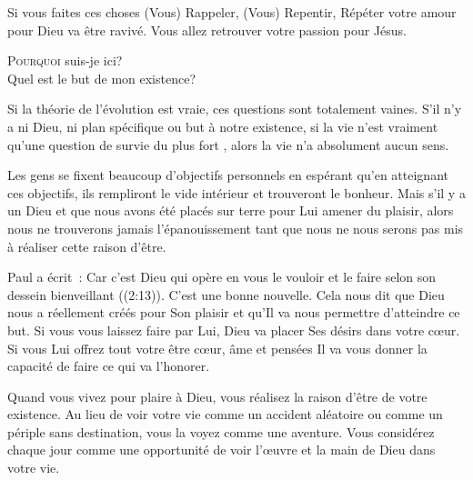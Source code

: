 Si vous faites ces choses
 \ocadr (Vous) Rappeler, (Vous) Repentir, Répéter \fcadr{}
 votre amour pour Dieu va être ravivé.
 Vous allez retrouver votre passion pour Jésus. 

\dvrule






\lettrine{P}{ourquoi} suis-je ici?\\
 Quel est le but de mon existence?

Si la théorie de l'évolution est vraie, ces questions sont totalement vaines.
 S'il n'y a ni Dieu, ni plan spécifique ou but à notre existence,
 si la vie n'est vraiment qu'une question de \og survie du plus fort \fg{},
 alors la vie n'a absolument aucun sens. 

Les gens se fixent beaucoup d'objectifs personnels en espérant
 qu'en atteignant ces objectifs, ils rempliront le vide intérieur
 et trouveront le bonheur. Mais s'il y a un Dieu et que nous avons
 été placés sur terre pour Lui amener du plaisir,
 alors nous ne trouverons jamais l'épanouissement
 tant que nous ne nous serons pas mis à réaliser cette raison d'être. 


Paul a écrit~: 
 \og Car c'est Dieu qui opère en vous le vouloir et le faire
 selon son dessein bienveillant \fg{} ((2:13)).
 C'est une bonne nouvelle. Cela nous dit que Dieu nous a réellement
 créés pour Son plaisir \ocadr et qu'Il va nous permettre d'atteindre ce but.
 Si vous vous laissez faire par Lui, Dieu va placer Ses désirs
 dans votre cœur. Si vous Lui offrez tout votre être
 \ocadr cœur, âme et pensées \fcadr{} Il va vous donner la capacité
 de faire ce qui va l'honorer. 

Quand vous vivez pour plaire à Dieu, vous réalisez la raison d'être
 de votre existence. Au lieu de voir votre vie comme un accident aléatoire
 ou comme un périple sans destination, vous la voyez comme une aventure.
 Vous considérez chaque jour comme une opportunité de voir l'œuvre
 et la main de Dieu dans votre vie. 

